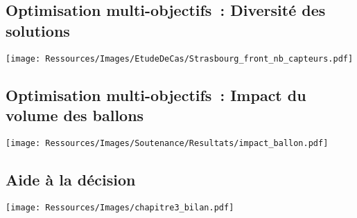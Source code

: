 \documentclass[xcolor=x11names, compress, 11pt]{beamer}
\newcommand{\addsubtitle}[1]{%
\begin{beamercolorbox}[sep=2pt,center,shadow=true,rounded=true]{footlinecolor}
    #1\par%
\end{beamercolorbox}%
}
\newcommand{\addalert}[1]{%
\begin{beamercolorbox}[sep=2pt,center,shadow=true,rounded=true]{alerted text}
    #1\par%
\end{beamercolorbox}%
}
\begin{document}
\subsection{Optimisation multi-objectifs~: Diversité des solutions}
\begin{frame}[t]
    \begin{adjustwidth}{-2.4em}{-2.4em}
        \texttt{[image: Ressources/Images/EtudeDeCas/Strasbourg\_front\_nb\_capteurs.pdf]}
    \end{adjustwidth}
\end{frame}




\subsection{Optimisation multi-objectifs~: Impact du volume des ballons}
\begin{frame}[t]
    \begin{adjustwidth}{-2.4em}{-2.4em}
        \texttt{[image: Ressources/Images/Soutenance/Resultats/impact\_ballon.pdf]}
    \end{adjustwidth}

\end{frame}


\subsection{Aide à la décision}
\begin{frame}[t]
    \vfill
    \centering
    \texttt{[image: Ressources/Images/chapitre3\_bilan.pdf]}
    \vfill
\end{frame}
\end{document}
